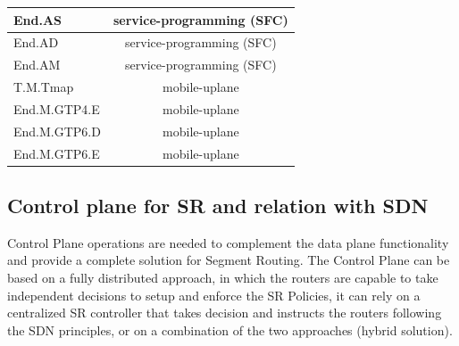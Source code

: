 \begin{table}[htbp]
\begin{tabular}{|l|c|}
\hline
End.AS            & service-programming (SFC) \cite{id-sr-service-programming} \\
\hline
End.AD            & service-programming (SFC) \cite{id-sr-service-programming} \\
\hline
End.AM            & service-programming (SFC) \cite{id-sr-service-programming} \\
\hline
\hline
T.M.Tmap          & mobile-uplane \cite{id-srv6-mobile-uplane} \\
\hline
End.M.GTP4.E      & mobile-uplane \cite{id-srv6-mobile-uplane} \\
\hline
End.M.GTP6.D      & mobile-uplane \cite{id-srv6-mobile-uplane} \\
\hline
End.M.GTP6.E      & mobile-uplane \cite{id-srv6-mobile-uplane} \\
\hline
\end{tabular}
\end{table}



\subsection{Control plane for SR and relation with SDN}
\label{sec:sr_control_plane}

Control Plane operations are needed to complement the data plane functionality and provide a complete solution for Segment Routing. The Control Plane can be based on a fully distributed approach, in which the routers are capable to take independent decisions to setup and enforce the SR Policies, it can rely on a centralized SR controller that takes decision and instructs the routers following the SDN principles, or on a combination of the two approaches (hybrid solution). 

